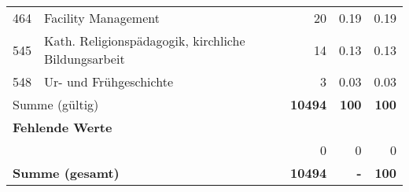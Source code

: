 \begin{longtable}{lXrrr}
        464 & \multicolumn{1}{X}{Facility Management} & %
          \num{20} &
          \num[round-mode=places,round-precision=2]{0.19} &
          \num[round-mode=places,round-precision=2]{0.19} \\

        545 & \multicolumn{1}{X}{Kath. Religionspädagogik, kirchliche Bildungsarbeit} & %
          \num{14} &
          \num[round-mode=places,round-precision=2]{0.13} &
          \num[round-mode=places,round-precision=2]{0.13} \\

        548 & \multicolumn{1}{X}{Ur- und Frühgeschichte} & %
          \num{3} &
          \num[round-mode=places,round-precision=2]{0.03} &
          \num[round-mode=places,round-precision=2]{0.03} \\

     \midrule
     \multicolumn{2}{l}{Summe (gültig)} &
       \textbf{\num{10494}} &
     \textbf{\num{100}} &
       \textbf{\num[round-mode=places,round-precision=2]{100}} \\
     \multicolumn{5}{l}{\textbf{Fehlende Werte}}\\
      & & 0 & 0 & 0 \\
     \midrule
     \multicolumn{2}{l}{\textbf{Summe (gesamt)}} &
          \textbf{\num{10494}} &
        \textbf{-} &
        \textbf{\num{100}} \\
     \bottomrule
     \end{longtable}
     
